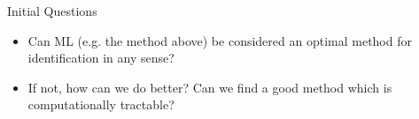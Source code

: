 \documentclass[final]{beamer}
\newlength{\sepwid}
\newlength{\onecolwid}
\begin{document}
\begin{frame}[t]
\begin{columns}[t]
\begin{column}{\onecolwid}
\begin{block}{Initial Questions}
\begin{itemize}
\item Can ML (e.g. the method above) be considered an optimal method for identification in any sense?
\item If not, how can we do better? Can we find a good method which is computationally tractable?
\end{itemize}
\end{block}







\end{column} %

\begin{column}{\sepwid}\end{column} %


\begin{column}{\onecolwid}


\end{column}
\end{columns}
\end{frame}
\end{document}
